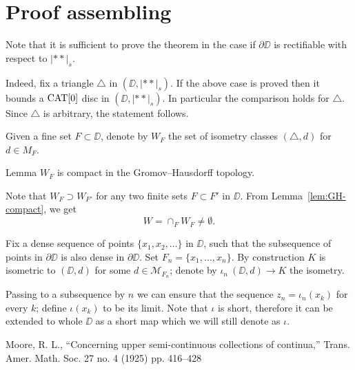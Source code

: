 \documentclass[a4paper,10pt]{amsart}
\begin{document}
\section{Proof assembling}

Note that it is sufficient to prove the theorem 
in the case if $\partial \DD$ is rectifiable with respect to $|{*}{*}|_s$.

Indeed, fix a triangle $\triangle$ in $(\DD,|{*}{*}|_s)$.
If the above case is proved 
then it bounds a $\mathop{\rm CAT}\nolimits[0]$ disc in $(\DD,|{*}{*}|_s)$.
In particular the comparison holds for $\triangle$.
Since $\triangle$ is arbitrary, the statement follows.

Given a fine set $F\subset \DD$,
denote by $W_F$
the set of isometry classes $(\triangle,d)$ for $d\in {M}_F$.

\begin{thm}{Lemma}\label{lem:GH-compact}
$W_F$
is compact in the Gromov--Hausdorff topology.
\end{thm}

Note that $W_F\supset W_{F'}$
for any two finite sets $F\subset F'$ in $\DD$.
From Lemma~\ref{lem:GH-compact}, we get
\[W
=
\cap_{F}W_F\ne \emptyset.\]

Fix a dense sequence of points $\{x_1,x_2,\dots\}$ in $\DD$,
such that the subsequence of points in $\partial \DD$
is also dense in $\partial \DD$.
Set $F_n=\{x_1,\dots,x_n\}$.
By construction $K$ is isometric to $(\DD,d)$ for some $d\in\mathcal{M}_{F_n}$;
denote by $\iota_n\:(\DD,d)\to K$ the isometry.

Passing to a subsequence by $n$ we can ensure that the sequence
$z_n=\iota_n(x_k)$ for every $k$;
define $\iota(x_k)$ to be its limit.
Note that $\iota$ is short, therefore it can be extended to whole $\DD$ as a short map which we will still denote as $\iota$.


\begin{thebibliography}{52}
Moore, R. L.,
``Concerning upper semi-continuous collections of continua,''
Trans. Amer. Math. Soc. 27 no. 4 (1925) pp. 416--428
\end{thebibliography}
\end{document}
